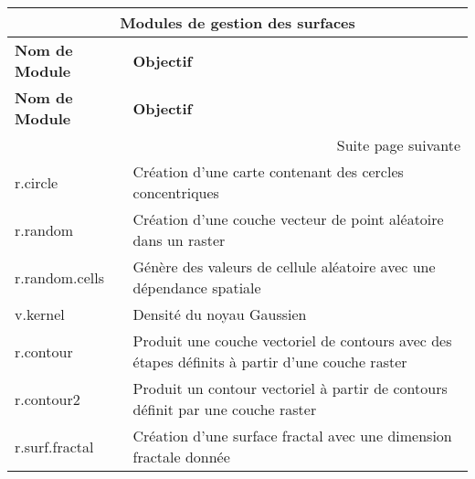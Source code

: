 \begin{center}
{\setlength{\extrarowheight}{10pt}
\small
\begin{longtable}{|p{4cm}|p{10cm}|}
  \hline \multicolumn{2}{|c|}{\textbf{Modules de gestion des surfaces}} \\
\hline \textbf{Nom de Module}&\textbf{Objectif}\\
\endfirsthead
\textbf{Nom de Module}&\textbf{Objectif}\\
\endhead
\hline \multicolumn{2}{|r|}{{Suite page suivante}} \\ \hline
\endfoot
\endlastfoot
  \hline r.circle & Création d'une carte contenant des cercles concentriques \\
  \hline r.random & Création d'une couche vecteur de point aléatoire dans un raster\\
  \hline r.random.cells & Génère des valeurs de cellule aléatoire avec une dépendance spatiale \\
  \hline v.kernel & Densité du noyau Gaussien \\
  \hline r.contour & Produit une couche vectoriel de contours avec des étapes définits à partir d'une couche raster\\
  \hline r.contour2 & Produit un contour vectoriel à partir de contours définit par une couche raster\\
  \hline r.surf.fractal & Création d'une surface fractal avec une dimension fractale donnée\\

\end{longtable}}
\end{center}
